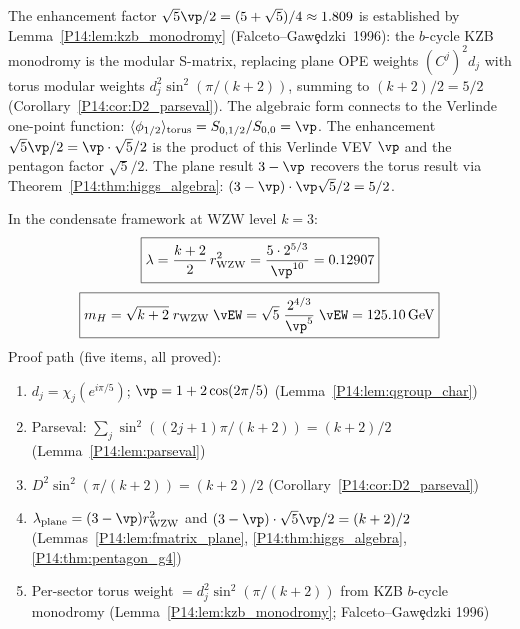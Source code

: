 \begin{remark}
\label{P14:rem:torus_enhancement}
The enhancement factor $\sqrt{5}\vp/2=(5+\sqrt{5})/4\approx1.809$
is established by Lemma~\ref{P14:lem:kzb_monodromy} (Falceto--Gaw\c{e}dzki~1996):
the $b$-cycle KZB monodromy is the modular S-matrix, replacing plane OPE weights
$(C^j)^2 d_j$ with torus modular weights $d_j^2\sin^2(\pi/(k+2))$,
summing to $(k+2)/2=5/2$ (Corollary~\ref{P14:cor:D2_parseval}).
The algebraic form connects to the Verlinde one-point function:
$\langle\phi_{1/2}\rangle_{\mathrm{torus}} = S_{0,1/2}/S_{0,0}=\vp$.
The enhancement $\sqrt{5}\vp/2=\vp\cdot\sqrt{5}/2$ is the product of this
Verlinde VEV $\vp$ and the pentagon factor $\sqrt{5}/2$.
The plane result $3-\vp$ recovers the torus result via Theorem~\ref{P14:thm:higgs_algebra}:
$(3-\vp)\cdot\vp\sqrt{5}/2=5/2$.
\end{remark}

\begin{theorem}
\label{P14:thm:higgs}
In the condensate framework at WZW level $k=3$:
\begin{equation}
  \boxed{\lambda = \frac{k+2}{2}\,r_{\mathrm{WZW}}^2
  = \frac{5\cdot 2^{5/3}}{\vp^{10}} = 0.12907}
  \label{P14:eq:lambda_higgs}
\end{equation}
\begin{equation}
  \boxed{m_H = \sqrt{k+2}\;r_{\mathrm{WZW}}\;\vEW
  = \sqrt{5}\;\frac{2^{4/3}}{\vp^5}\;\vEW = 125.10\,\mathrm{GeV}}
  \label{P14:eq:mH_formula}
\end{equation}
Proof path (five items, all proved):
\begin{enumerate}[noitemsep,label=(\roman*)]
\item $d_j=\chi_j(e^{i\pi/5})$; $\vp=1+2\cos(2\pi/5)$ (Lemma~\ref{P14:lem:qgroup_char})
\item Parseval: $\sum_j\sin^2((2j+1)\pi/(k+2))=(k+2)/2$ (Lemma~\ref{P14:lem:parseval})
\item $D^2\sin^2(\pi/(k+2))=(k+2)/2$ (Corollary~\ref{P14:cor:D2_parseval})
\item $\lambda_{\mathrm{plane}}=(3-\vp)r_{\mathrm{WZW}}^2$ and
  $(3-\vp)\cdot\sqrt{5}\vp/2=(k+2)/2$ (Lemmas~\ref{P14:lem:fmatrix_plane},
  \ref{P14:thm:higgs_algebra}, \ref{P14:thm:pentagon_g4})
\item Per-sector torus weight $= d_j^2\sin^2(\pi/(k+2))$ from KZB $b$-cycle
  monodromy (Lemma~\ref{P14:lem:kzb_monodromy}; Falceto--Gaw\c{e}dzki 1996)
\end{enumerate}
\end{theorem}

